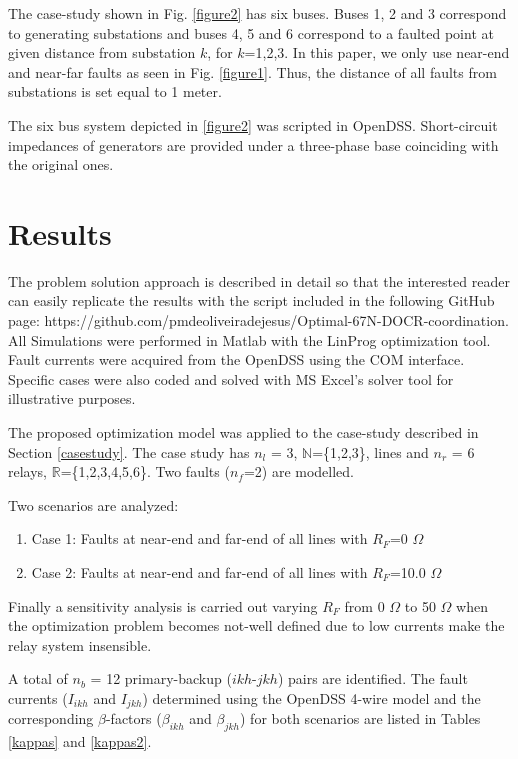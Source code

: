 \documentclass[letterpaper, 10 pt, conference]{IEEEtran}
\begin{document}
The case-study shown in Fig. \ref{figure2} has six buses. Buses 1, 2 and 3 correspond to generating substations and buses 4, 5 and 6 correspond to a faulted point at given distance from substation $k$, for $k$=1,2,3. In this paper, we only use near-end and near-far faults as seen in  Fig. \ref{figure1}. Thus, the distance of all faults from substations is set equal to 1 meter.


The six bus system depicted in  \ref{figure2} was scripted in OpenDSS. Short-circuit impedances of generators are provided under a three-phase base coinciding with the original ones.




  \section{Results}  \label{results}

The problem solution approach is described in detail so that the interested reader can easily replicate the results with the script included in the following GitHub page: https://github.com/pmdeoliveiradejesus/Optimal-67N-DOCR-coordination. All Simulations were performed in Matlab with the LinProg optimization tool. Fault currents were acquired from the OpenDSS using the COM interface. Specific cases were also coded and solved with MS Excel's solver tool for illustrative purposes.


  The proposed optimization model was applied to the case-study described in Section \ref{casestudy}.
    The case study has $n_l$ = 3, $\mathds{N}$=\{1,2,3\}, lines and $n_r$ = 6 relays,
      $\mathds{R}$=\{1,2,3,4,5,6\}. Two faults ($n_f$=2) are modelled.


      Two scenarios are analyzed:
\begin{enumerate}
  \item Case 1: Faults at near-end and far-end of all lines with $R_F$=0 $\Omega$
  \item Case 2: Faults at near-end and far-end of all lines with $R_F$=10.0 $\Omega$
\end{enumerate}

Finally a sensitivity analysis is carried out varying $R_F$  from 0  $\Omega$ to 50  $\Omega$  when the optimization problem becomes not-well defined due to low currents make the relay system insensible.

A total of $n_b$ = 12 primary-backup ($ikh$-$jkh$) pairs are identified. The fault currents ($I_{ikh}$ and $I_{jkh}$) determined using the OpenDSS 4-wire model and the corresponding $\beta$-factors ($\beta_{ikh}$ and $\beta_{jkh}$) for both scenarios are listed in Tables \ref{kappas} and \ref{kappas2}.
\end{document}
